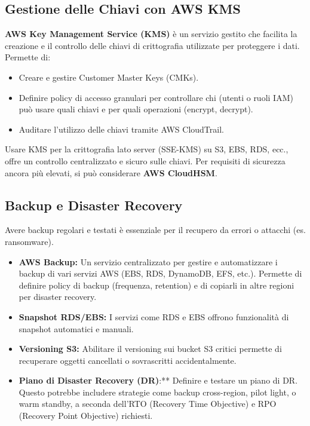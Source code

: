 \documentclass[a4paper,12pt]{report}
\begin{document}
\subsection{Gestione delle Chiavi con AWS KMS}
\label{subsec:kms}
\textbf{AWS Key Management Service (KMS)} è un servizio gestito che facilita la creazione e il controllo delle chiavi di crittografia utilizzate per proteggere i dati. Permette di:
\begin{itemize}
    \item Creare e gestire Customer Master Keys (CMKs).
    \item Definire policy di accesso granulari per controllare chi (utenti o ruoli IAM) può usare quali chiavi e per quali operazioni (encrypt, decrypt).
    \item Auditare l'utilizzo delle chiavi tramite AWS CloudTrail.
\end{itemize}
Usare KMS per la crittografia lato server (SSE-KMS) su S3, EBS, RDS, ecc., offre un controllo centralizzato e sicuro sulle chiavi. Per requisiti di sicurezza ancora più elevati, si può considerare \textbf{AWS CloudHSM}.

\subsection{Backup e Disaster Recovery}
\label{subsec:backup-dr}
Avere backup regolari e testati è essenziale per il recupero da errori o attacchi (es. ransomware).
\begin{itemize}
    \item \textbf{AWS Backup:} Un servizio centralizzato per gestire e automatizzare i backup di vari servizi AWS (EBS, RDS, DynamoDB, EFS, etc.). Permette di definire policy di backup (frequenza, retention) e di copiarli in altre regioni per disaster recovery.
    \item \textbf{Snapshot RDS/EBS:} I servizi come RDS e EBS offrono funzionalità di snapshot automatici e manuali.
    \item \textbf{Versioning S3:} Abilitare il versioning sui bucket S3 critici permette di recuperare oggetti cancellati o sovrascritti accidentalmente.
    \item \textbf{Piano di Disaster Recovery (DR)}:** Definire e testare un piano di DR. Questo potrebbe includere strategie come backup cross-region, pilot light, o warm standby, a seconda dell'RTO (Recovery Time Objective) e RPO (Recovery Point Objective) richiesti.
\end{itemize}
\end{document}
